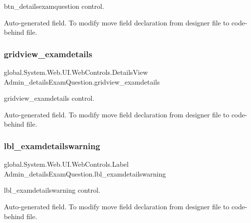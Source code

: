 btn\+\_\+detailsexamquestion control. 

Auto-\/generated field. To modify move field declaration from designer file to code-\/behind file. \mbox{\label{class_admin__details_exam_question_a043f21112f8b792f69d4ac754c621366}} 
\subsubsection{\texorpdfstring{gridview\_examdetails}{gridview\_examdetails}}
{\footnotesize\ttfamily global.\+System.\+Web.\+U\+I.\+Web\+Controls.\+Details\+View Admin\+\_\+details\+Exam\+Question.\+gridview\+\_\+examdetails\hspace{0.3cm}{\ttfamily [protected]}}



gridview\+\_\+examdetails control. 

Auto-\/generated field. To modify move field declaration from designer file to code-\/behind file. \mbox{\label{class_admin__details_exam_question_ababe7d036acbce604df387e9a254ccc0}} 
\subsubsection{\texorpdfstring{lbl\_examdetailswarning}{lbl\_examdetailswarning}}
{\footnotesize\ttfamily global.\+System.\+Web.\+U\+I.\+Web\+Controls.\+Label Admin\+\_\+details\+Exam\+Question.\+lbl\+\_\+examdetailswarning\hspace{0.3cm}{\ttfamily [protected]}}



lbl\+\_\+examdetailswarning control. 

Auto-\/generated field. To modify move field declaration from designer file to code-\/behind file. \mbox{\label{class_admin__details_exam_question_a54f364fba301ac92ceabf45a32e4e065}} 
